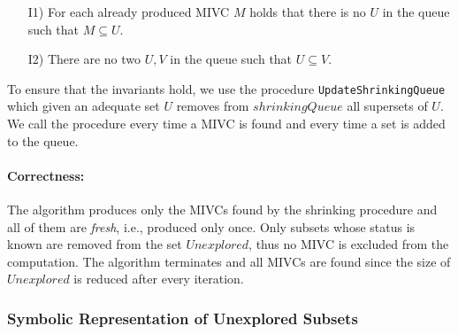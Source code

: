 \begin{itemize}
	\item[I1)] For each already produced MIVC $M$ holds that there is no $U$ in the queue such that $M \subseteq U$.
	\item[I2)] There are no two $U, V$ in the queue such that $U \subseteq V$.
\end{itemize}

To ensure that the invariants hold, we use the procedure \texttt{UpdateShrinking\-Queue} which given an adequate set $U$ removes from $\mathit{shrinkingQueue}$ all supersets of $U$. We call the procedure every time a MIVC is found and every time a set is added to the queue.

\paragraph{Correctness:}
The algorithm produces only the MIVCs found by the shrinking procedure and all of them are \emph{fresh}, i.e., produced only once. Only subsets whose status is known are removed from the set $\mathit{Unexplored}$, thus no MIVC is excluded from the computation. The algorithm terminates and all MIVCs are found since the size of $\mathit{Unexplored}$ is reduced after every iteration.
		

\subsubsection{Symbolic Representation of Unexplored Subsets}
\label{sec:symbolic-representation}






